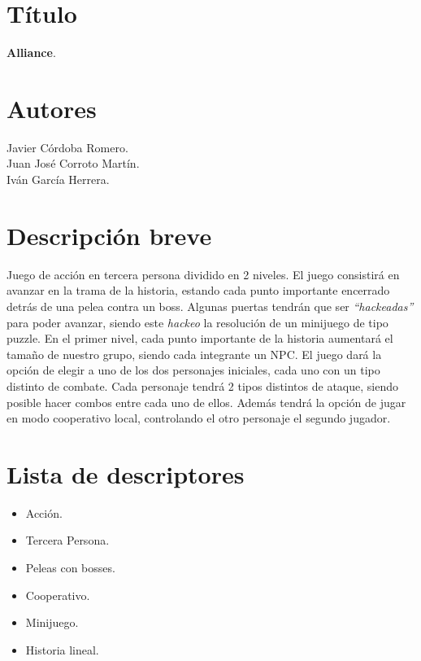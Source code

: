 \documentclass[11pt, twoside]{article}
\begin{document}
\pagestyle{insection}
\section{Título}

\textbf{Alliance}.

\pagestyle{insection}
\section{Autores}
Javier Córdoba Romero. \\
Juan José Corroto Martín. \\
Iván García Herrera.

\pagestyle{insection}
\section{Descripción breve}

Juego de acción en tercera persona dividido en 2 niveles. El juego consistirá en avanzar en la trama de la historia, estando cada punto importante encerrado detrás de una pelea contra un boss. Algunas puertas tendrán que ser \textit{``hackeadas''} para poder avanzar, siendo este \textit{hackeo} la resolución de un minijuego de tipo puzzle. En el primer nivel, cada punto importante de la historia aumentará el tamaño de nuestro grupo, siendo cada integrante un NPC. El juego dará la opción de elegir a uno de los dos personajes iniciales, cada uno con un tipo distinto de combate. Cada personaje tendrá 2 tipos distintos de ataque, siendo posible hacer combos entre cada uno de ellos. Además tendrá la opción de jugar en modo cooperativo local, controlando el otro personaje el segundo jugador.

\pagestyle{insection}
\section{Lista de descriptores}
\begin{itemize}
\item Acción.
\item Tercera Persona.
\item Peleas con bosses.
\item Cooperativo.
\item Minijuego.
\item Historia lineal.
\end{itemize}
\end{document}
